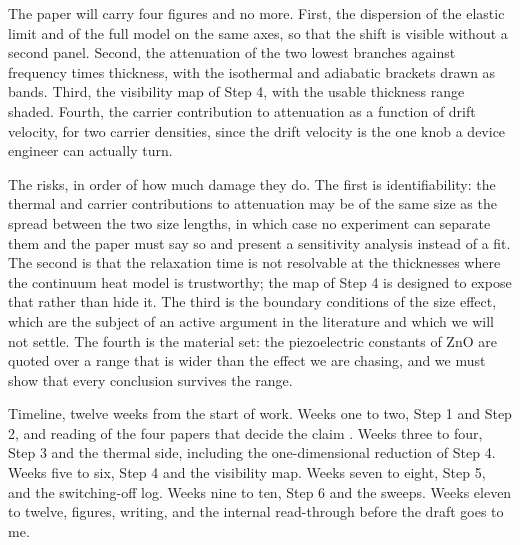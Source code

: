 \documentclass[11pt]{article}
\begin{document}
The paper will carry four figures and no more. First, the dispersion of the elastic limit and of the full
model on the same axes, so that the shift is visible without a second panel. Second, the attenuation of the
two lowest branches against frequency times thickness, with the isothermal and adiabatic brackets drawn as
bands. Third, the visibility map of Step 4, with the usable thickness range shaded. Fourth, the
carrier contribution to attenuation as a function of drift velocity, for two carrier densities, since the
drift velocity is the one knob a device engineer can actually turn.

The risks, in order of how much damage they do. The first is identifiability: the thermal and carrier
contributions to attenuation may be of the same size as the spread between the two size lengths, in which
case no experiment can separate them and the paper must say so and present a sensitivity analysis instead
of a fit. The second is that the relaxation time is not resolvable at the thicknesses where the continuum
heat model is trustworthy; the map of Step 4 is designed to expose that rather than hide it. The third is
the boundary conditions of the size effect, which are the subject of an active argument in the literature
\cite{Barretta2018} and which we will not settle. The fourth is the material set: the piezoelectric
constants of ZnO are quoted over a range that is wider than the effect we are chasing, and we must show
that every conclusion survives the range.

Timeline, twelve weeks from the start of work. Weeks one to two, Step 1 and Step 2, and reading of the four
papers that decide the claim \cite{Qu2023,Sharma2004,Othmani2017,YangZhou2005}. Weeks three to four, Step 3
and the thermal side, including the one-dimensional reduction of Step 4. Weeks five to six, Step 4 and the
visibility map. Weeks seven to eight, Step 5, and the switching-off log. Weeks nine to ten, Step 6 and the
sweeps. Weeks eleven to twelve, figures, writing, and the internal read-through before the draft goes to
me.
\end{document}
